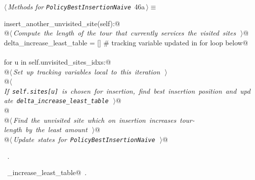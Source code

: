 \documentclass[11.5pt]{report}
\begin{document}
\vspace{-0.8cm}\newchunk 
\begin{flushleft} \small\label{scrap69}\raggedright\small
{} $\langle\,${\itshape Methods for \verb|PolicyBestInsertionNaive|}\nobreak\ {\footnotesize {46a}}$\,\rangle\equiv$
\vspace{-1ex}
\begin{list}{}{} \item
\mbox{}\verb@def insert_another_unvisited_site(self):@\\
\mbox{}\verb@   @\hbox{$\langle\,${\itshape Compute the length of the tour that currently services the visited sites}\nobreak\ {\footnotesize {}}$\,\rangle$}\verb@    @\\
\mbox{}\verb@   delta_increase_least_table = [] # tracking variable updated in for loop below@\\
\mbox{}\verb@@\\
\mbox{}\verb@   for u in self.unvisited_sites_idxs:@\\
\mbox{}\verb@      @\hbox{$\langle\,${\itshape Set up tracking variables local to this iteration}\nobreak\ {\footnotesize {}}$\,\rangle$}\verb@@\\
\mbox{}\verb@      @\hbox{$\langle\,${\itshape If \texttt{self.sites[u]} is chosen for insertion, find best insertion position and update \texttt{delta\_increase\_least\_table}}\nobreak\ {\footnotesize {}}$\,\rangle$}\verb@  @\\
\mbox{}\verb@                 @\\
\mbox{}\verb@   @\hbox{$\langle\,${\itshape Find the unvisited site which on insertion increases tour-length by the least amount}\nobreak\ {\footnotesize {}}$\,\rangle$}\verb@     @\\
\mbox{}\verb@   @\hbox{$\langle\,${\itshape Update states for \texttt{PolicyBestInsertionNaive}}\nobreak\ {\footnotesize {}}$\,\rangle$}\verb@ @\\
\mbox{}\verb@@{\NWsep}
\end{list}
\vspace{-1.5ex}
\footnotesize
\begin{list}{}{\setlength{\itemsep}{-\parsep}\setlength{\itemindent}{-\leftmargin}}
\item \NWtxtMacroRefIn\ .
\item \NWtxtIdentsDefed\nobreak\  \verb@delta_increase_least_table@\nobreak\ .
\item{}
\end{list}
\vspace{4ex}
\end{flushleft}
\end{document}
